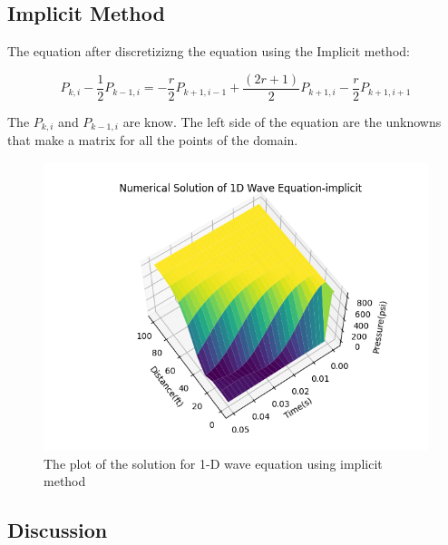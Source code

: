 \documentclass[12pt]{article}
\begin{document}
\subsection{Implicit Method}\label{}

The equation after discretizizng the equation using the Implicit method:

\begin{equation}
    P_{k,i} - \frac{1}{2} P_{k-1,i} = -\frac{r}{2} P_{k+1,i-1} + \frac{(2r+1)}{2} P_{k+1,i} - \frac{r}{2} P_{k+1,i+1}
\end{equation}

The \( P_{k,i} \) and \( P_{k-1,i} \) are know. The left side of the equation are the unknowns that make a matrix for all the points of the domain.


\begin{figure}
\begin{center}
\includegraphics[width=\textwidth]{implicit_solution.png}
\caption{The plot of the solution for 1-D wave equation using implicit method}{}
\end{center}
\end{figure}
    

\subsection{Discussion}\label{}
\end{document}
